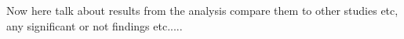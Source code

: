 Now here talk about results from the analysis compare them to other studies etc, any significant or not findings etc.....